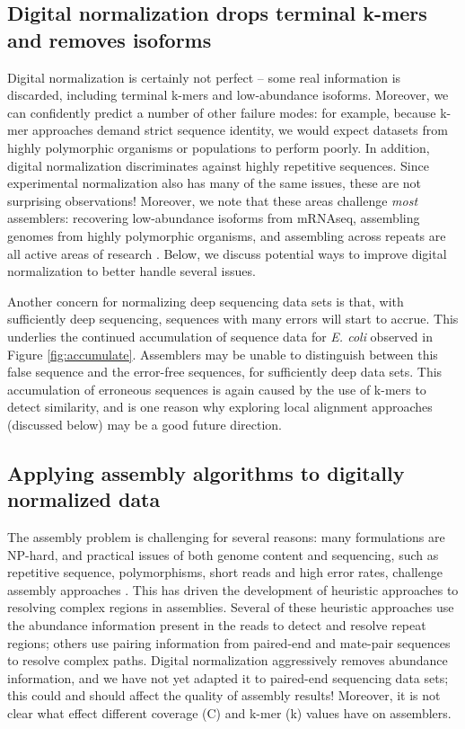 \documentclass[10pt]{article}
\begin{document}

\subsection*{Digital normalization drops terminal k-mers and removes isoforms}

Digital normalization is certainly not perfect -- some real
information is discarded, including terminal k-mers and low-abundance
isoforms.  Moreover, we can confidently predict a number of other
failure modes: for example, because k-mer approaches demand strict
sequence identity, we would expect datasets from highly polymorphic
organisms or populations to perform poorly.  In addition, digital
normalization discriminates against highly repetitive sequences. Since
experimental normalization also has many of the same issues, these are
not surprising observations!  Moreover, we note that these areas
challenge {\em most} assemblers: recovering low-abundance isoforms
from mRNAseq, assembling genomes from highly polymorphic organisms,
and assembling across repeats are all active areas of research
\cite{pubmed18549302,pubmed20633259,pubmed18541131}.  Below, we
discuss potential ways to improve digital normalization to better
handle several issues.

Another concern for normalizing deep sequencing data sets is that,
with sufficiently deep sequencing, sequences with many errors will
start to accrue.  This underlies the continued accumulation of
sequence data for {\em E. coli} observed in Figure
\ref{fig:accumulate}.  Assemblers may be unable to distinguish between
this false sequence and the error-free sequences, for sufficiently
deep data sets.  This accumulation of erroneous sequences is again
caused by the use of k-mers to detect similarity, and is one reason
why exploring local alignment approaches (discussed below) may be a
good future direction.

\subsection*{Applying assembly algorithms to digitally normalized data}

The assembly problem is challenging for several reasons: many
formulations are NP-hard, and practical issues of both genome content
and sequencing, such as repetitive sequence, polymorphisms, short
reads and high error rates, challenge assembly approaches
\cite{pubmed19580519}.  This has driven the development of heuristic
approaches to resolving complex regions in assemblies.  Several of
these heuristic approaches use the abundance information present in
the reads to detect and resolve repeat regions; others use pairing
information from paired-end and mate-pair sequences to resolve complex
paths.  Digital normalization aggressively removes abundance
information, and we have not yet adapted it to paired-end sequencing
data sets; this could and should affect the quality of assembly
results! Moreover, it is not clear what effect different coverage (C)
and k-mer (k) values have on assemblers.
\end{document}
